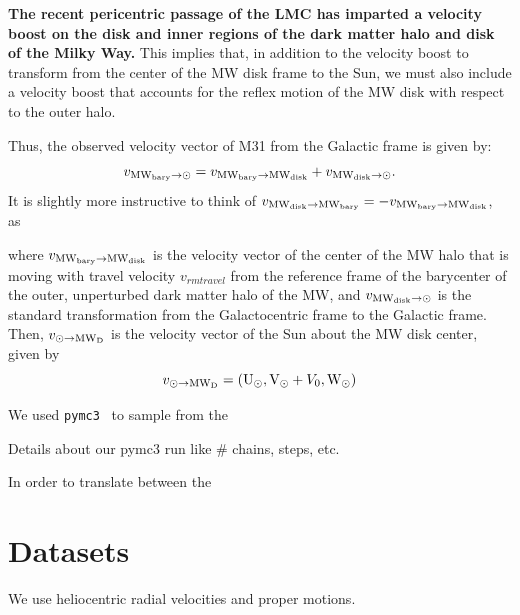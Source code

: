 \documentclass[twocolumn]{aastex631}
\begin{document}
\textbf{The recent pericentric passage of the LMC has imparted a velocity boost on the disk and inner regions of the dark matter halo and disk of the Milky Way.} This implies that, in addition to the velocity boost to transform from the center of the MW disk frame to the Sun, we must also include a velocity boost that accounts for the 
reflex motion of the MW disk with respect to the outer halo.

Thus, the observed velocity vector of M31 from the Galactic frame is given by:
\begin{equation}
  v_{\rm MW_{bary} \to \odot} = v_{\rm MW_{bary} \to MW_{disk}} + v_{\rm MW_{disk} \to \odot}.
\end{equation}
It is slightly more instructive to think of $v_{\rm MW_{disk} \to MW_{bary}}=-v_{\rm MW_{bary} \to MW_{disk}}$, as~\cite{Petersen2021}

where $v_{\rm MW_{bary} \to MW_{disk}}$ is the velocity vector of the center of the MW halo that is moving with travel velocity $v_{rm travel}$ from the reference frame of the barycenter of the outer, unperturbed dark matter halo of the MW, and $v_{\rm MW_{disk} \to \odot}$ is the standard transformation from the Galactocentric frame to the Galactic frame.
Then, $v_{\odot \to \rm MW_{D}}$ is the velocity vector of the Sun about the MW disk center, given by 
\begin{equation}
  v_{\odot \to \rm MW_{D}}=({\rm U}_\odot, {\rm V}_\odot + V_0, {\rm W}_\odot)  
\end{equation}



We used \texttt{pymc3}~\citep{Salvatier2016} to sample from the 

Details about our pymc3 run like \# chains, steps, etc.




In order to translate between the 






\section{Datasets}
We use heliocentric radial velocities and proper motions. 
\end{document}
